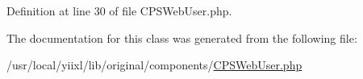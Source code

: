 Definition at line 30 of file CPSWebUser.php.



The documentation for this class was generated from the following file:\begin{DoxyCompactItemize}
\item 
/usr/local/yiixl/lib/original/components/\hyperlink{CPSWebUser_8php}{CPSWebUser.php}\end{DoxyCompactItemize}
